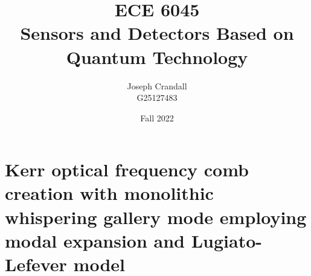 
\usepackage{algorithm, algpseudocode, bm, color, gensymb, listings, siunitx, soul, subfiles, verbatim}
\usepackage[a4paper, total={7.5in, 10in}]{geometry}

\title{ECE 6045 \\ Sensors and Detectors Based on Quantum Technology}
\author{Joseph Crandall \\ G25127483}
\date{Fall 2022}


\maketitle

\begin{comment}

\section{Hw 1}


\section{HW 2}




\section{Hw 3}


\end{comment}

\section{Kerr optical frequency comb creation with monolithic whispering gallery mode employing modal expansion and Lugiato-Lefever model}





